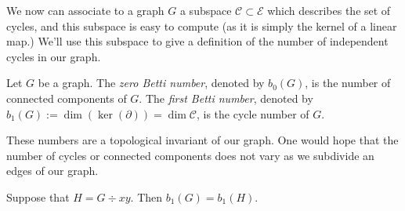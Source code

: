 We now can associate to a graph $G$ a subspace $\mathcal C\subset \mathcal E$ which describes the set of cycles, and this subspace is easy to compute (as it is simply the kernel of a linear map.) We'll use this subspace to give a definition of the number of independent cycles in our graph. 
\begin{definition}
Let $G$ be a graph. The \emph{zero Betti number}, denoted by $b_0(G)$, is the number of connected components of $G$. 
The \emph{first Betti number}, denoted by $b_1(G):=\dim (\ker (\partial))= \dim \mathcal C$, is the cycle number of $G$. 
\end{definition}
These numbers are a topological invariant of our graph. One would hope that the number of cycles or connected components does not vary as we subdivide an edges of our graph.  
\begin{theorem}
Suppose that $H=G\div xy$. Then $b_1(G)=b_1(H)$. 
\end{theorem}
